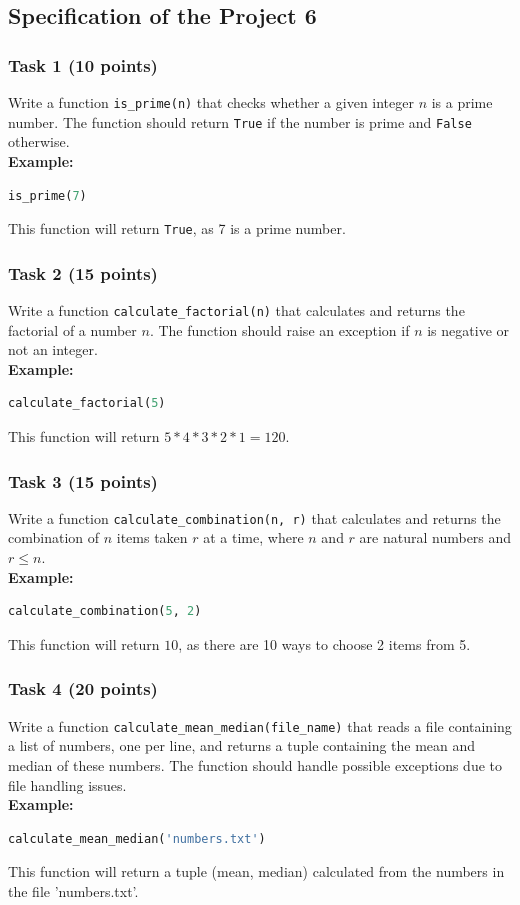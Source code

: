 \documentclass[12pt]{article}
\begin{document}
\subsection{Specification of the Project 6}

\subsubsection{Task 1 (10 points)}
Write a function \texttt{is\_prime(n)} that checks whether a given integer $n$ is a prime number. The function should return \texttt{True} if the number is prime and \texttt{False} otherwise. \\
\textbf{Example:}
\begin{lstlisting}[language=Python]
is_prime(7)
\end{lstlisting}
This function will return \texttt{True}, as 7 is a prime number.

\subsubsection{Task 2 (15 points)}
Write a function \texttt{calculate\_factorial(n)} that calculates and returns the factorial of a number $n$. The function should raise an exception if $n$ is negative or not an integer. \\
\textbf{Example:}
\begin{lstlisting}[language=Python]
calculate_factorial(5)
\end{lstlisting}
This function will return $5*4*3*2*1 = 120$.

\subsubsection{Task 3 (15 points)}
Write a function \texttt{calculate\_combination(n, r)} that calculates and returns the combination of $n$ items taken $r$ at a time, where $n$ and $r$ are natural numbers and $r \leq n$. \\
\textbf{Example:}
\begin{lstlisting}[language=Python]
calculate_combination(5, 2)
\end{lstlisting}
This function will return $10$, as there are 10 ways to choose 2 items from 5.

\subsubsection{Task 4 (20 points)}
Write a function \texttt{calculate\_mean\_median(file\_name)} that reads a file containing a list of numbers, one per line, and returns a tuple containing the mean and median of these numbers. The function should handle possible exceptions due to file handling issues. \\
\textbf{Example:}
\begin{lstlisting}[language=Python]
calculate_mean_median('numbers.txt')
\end{lstlisting}
This function will return a tuple (mean, median) calculated from the numbers in the file 'numbers.txt'.
\end{document}
